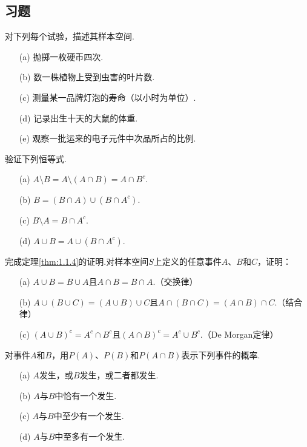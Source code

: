 \subsection{习题}\label{sec:1.7}
\setcounter{exercise}{0}

\begin{exercise}\label{exercise:1.1}
对下列每个试验，描述其样本空间.
\begin{enumerate}
\item[(a)] 抛掷一枚硬币四次.
\item[(b)] 数一株植物上受到虫害的叶片数.
\item[(c)] 测量某一品牌灯泡的寿命（以小时为单位）.
\item[(d)] 记录出生十天的大鼠的体重.
\item[(e)] 观察一批运来的电子元件中次品所占的比例.
\end{enumerate}
\end{exercise}

\begin{exercise}\label{exercise:1.2}
验证下列恒等式.
\begin{enumerate}
\item[(a)] $A\setminus B=A\setminus(A\cap B)=A\cap B^c$.
\item[(b)] $B=(B\cap A)\cup(B\cap A^c)$.
\item[(c)] $B\setminus A=B\cap A^c$.
\item[(d)] $A\cup B=A\cup(B\cap A^c)$.
\end{enumerate}
\end{exercise}

\begin{exercise}\label{exercise:1.3}
完成定理\ref{thm:1.1.4}的证明.对样本空间$S$上定义的任意事件$A$、$B$和$C$，证明：
\begin{enumerate}
\item[(a)] $A\cup B=B\cup A$且$A\cap B=B\cap A$.（交换律）
\item[(b)] $A\cup(B\cup C)=(A\cup B)\cup C$且$A\cap(B\cap C)=(A\cap B)\cap C$.（结合律）
\item[(c)] $(A\cup B)^c=A^c\cap B^c$且$(A\cap B)^c=A^c\cup B^c$.（De Morgan定律）
\end{enumerate}
\end{exercise}

\begin{exercise}\label{exercise:1.4}
对事件$A$和$B$，用$P(A)$、$P(B)$和$P(A\cap B)$表示下列事件的概率.
\begin{enumerate}
\item[(a)] $A$发生，或$B$发生，或二者都发生.
\item[(b)] $A$与$B$中恰有一个发生.
\item[(c)] $A$与$B$中至少有一个发生.
\item[(d)] $A$与$B$中至多有一个发生.
\end{enumerate}
\end{exercise}

